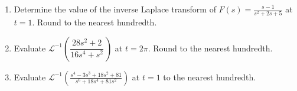 \documentclass{ximera}
\newcommand{\Laplace}[1]{\ensuremath{\mathcal{L}{\left[#1\right]}}}
\begin{document}
\begin{enumerate}[label=(\arabic*)]

\begin{enumerate}[label=(\alph*)]
\item $\displaystyle \dfrac{1}{s}\Laplace{f}$  %
\item $\displaystyle s\Laplace{f}-f(0)$
\item $\displaystyle s\Laplace{f}+f(0)$
\item $\displaystyle -\dfrac{1}{s}\Laplace{f}$
\item $\displaystyle s-\dfrac{1}{s}\Laplace{f}$
\item None of these
\end{enumerate}


\newpage

\item Determine the value of the inverse Laplace transform of $\displaystyle F(s)=\frac{s-1}{s^2+2s+5}$ at $t=1$.  Round to the nearest hundredth.



\item Evaluate $\displaystyle \mathcal{L}^{-1}\left(\dfrac{28s^2+2}{16s^4+s^2}\dfrac{}{}\right)$ at $t=2\pi$.  Round to the nearest hundredth.



\item Evaluate $\displaystyle \mathcal{L}^{-1}\left(\frac{s^4-3s^3+18s^2+81}{s^6+18s^4+81s^2}\right)$ at $t=1$ to the nearest hundredth.




\end{enumerate}
\end{document}
